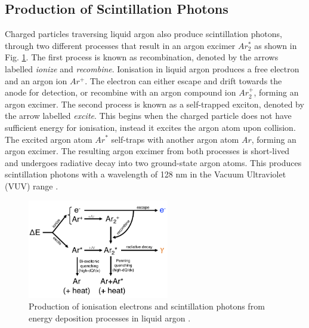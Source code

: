 \subsection{Production of Scintillation Photons}

\label{sec:scintillation}

Charged particles traversing liquid argon also produce scintillation photons, through two different processes that result in an argon excimer $Ar_{2}^{*}$ as shown in Fig. \ref{fig:recomb_diagram}.  
The first process is known as recombination, denoted by the arrows labelled \textit{ionize} and \textit{recombine}.
Ionisation in liquid argon produces a free electron and an argon ion $Ar^{+}$.
The electron can either escape and drift towards the anode for detection, or recombine with an argon compound ion $Ar_2^{+}$, forming an argon excimer.
The second process is known as a self-trapped exciton, denoted by the arrow labelled \textit{excite}.
This begins when the charged particle does not have sufficient energy for ionisation, instead it excites the argon atom upon collision.
The excited argon atom $Ar^{*}$ self-traps with another argon atom $Ar$, forming an argon excimer.
The resulting argon excimer from both processes is short-lived and undergoes radiative decay into two ground-state argon atoms.
This produces scintillation photons with a wavelength of 128 nm in the Vacuum Ultraviolet (VUV) range \cite{Lariat}.

\begin{figure}[ht!] 
\centering    
\includegraphics[width=0.55\textwidth]{recomb_diagram}
\caption[Energy Deposition in Liquid Argon Diagram]{
Production of ionisation electrons and scintillation photons from energy deposition processes in liquid argon \cite{Lariat}.
}
\label{fig:recomb_diagram}
\end{figure}


